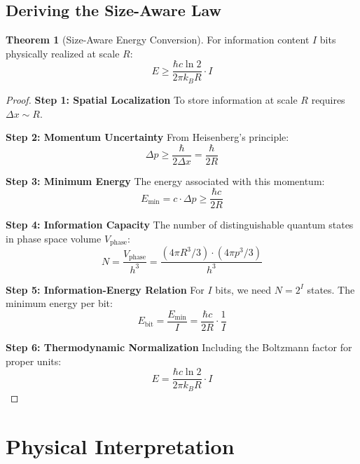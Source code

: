 \documentclass[11pt,a4paper]{article}
\theoremstyle{definition}
\newtheorem{theorem}{Theorem}[section]
\begin{document}
\subsection{Deriving the Size-Aware Law}

\begin{theorem}[Size-Aware Energy Conversion]
For information content $I$ bits physically realized at scale $R$:
\begin{equation}
E \geq \frac{\hbar c \ln 2}{2\pi k_B R} \cdot I
\end{equation}
\end{theorem}

\begin{proof}
\textbf{Step 1: Spatial Localization}
To store information at scale $R$ requires $\Delta x \sim R$.

\textbf{Step 2: Momentum Uncertainty}
From Heisenberg's principle:
\begin{equation}
\Delta p \geq \frac{\hbar}{2\Delta x} = \frac{\hbar}{2R}
\end{equation}

\textbf{Step 3: Minimum Energy}
The energy associated with this momentum:
\begin{equation}
E_{\text{min}} = c \cdot \Delta p \geq \frac{\hbar c}{2R}
\end{equation}

\textbf{Step 4: Information Capacity}
The number of distinguishable quantum states in phase space volume $V_{\text{phase}}$:
\begin{equation}
N = \frac{V_{\text{phase}}}{h^3} = \frac{(4\pi R^3/3) \cdot (4\pi p^3/3)}{h^3}
\end{equation}

\textbf{Step 5: Information-Energy Relation}
For $I$ bits, we need $N = 2^I$ states. The minimum energy per bit:
\begin{equation}
E_{\text{bit}} = \frac{E_{\text{min}}}{I} = \frac{\hbar c}{2R} \cdot \frac{1}{I}
\end{equation}

\textbf{Step 6: Thermodynamic Normalization}
Including the Boltzmann factor for proper units:
\begin{equation}
E = \frac{\hbar c \ln 2}{2\pi k_B R} \cdot I
\end{equation}
\end{proof}

\section{Physical Interpretation}
\end{document}
